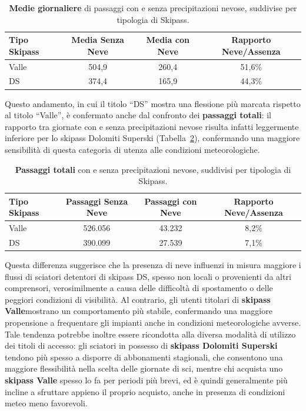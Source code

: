 \begin{table}[h]
    \centering
    \begin{tabular}{lccc}
        \toprule
        \textbf{Tipo Skipass} & \textbf{Media Senza Neve} & \textbf{Media con Neve} & \textbf{Rapporto Neve/Assenza} \\
        \midrule
        Valle & 504,9 & 260,4 & 51,6\% \\
        DS & 374,4 & 165,9 & 44,3\% \\
        \bottomrule
    \end{tabular}
    \caption{\textbf{Medie giornaliere} di passaggi con e senza precipitazioni nevose, suddivise per tipologia di Skipass.}
    \label{tab:Neve_medie}
\end{table}


Questo andamento, in cui il titolo “DS” mostra una flessione più marcata rispetto al titolo “Valle”, è confermato anche dal confronto dei \textbf{passaggi totali}: il rapporto tra giornate con e senza precipitazioni nevose risulta infatti leggermente inferiore per lo skipass Dolomiti Superski (Tabella~\ref{tab:Neve_totali}), confermando una maggiore sensibilità di questa categoria di utenza alle condizioni meteorologiche.

\begin{table}[h]
    \centering
    \begin{tabular}{lccc}
        \toprule
        \textbf{Tipo Skipass} & \textbf{Passaggi Senza Neve} & \textbf{Passaggi con Neve} & \textbf{Rapporto Neve/Assenza} \\
        \midrule
        Valle & 526.056 & 43.232 & 8,2\% \\
        DS & 390.099 & 27.539 & 7,1\% \\
        \bottomrule
    \end{tabular}
    \caption{\textbf{Passaggi totali} con e senza precipitazioni nevose, suddivisi per tipologia di Skipass.}
    \label{tab:Neve_totali}
\end{table}


Questa differenza suggerisce che la presenza di neve influenzi in misura maggiore i flussi di sciatori  detentori di skipass DS, spesso non locali o provenienti da altri comprensori, verosimilmente a causa delle difficoltà di spostamento o delle peggiori condizioni di visibilità.
Al contrario, gli utenti titolari di \textbf{skipass Valle}mostrano un comportamento più stabile, confermando una maggiore propensione a frequentare gli impianti anche in condizioni meteorologiche avverse.
Tale tendenza potrebbe inoltre essere ricondotta alla diversa modalità di utilizzo dei titoli di accesso: gli sciatori in possesso di \textbf{skipass Dolomiti Superski} tendono più spesso a disporre di abbonamenti stagionali, che consentono una maggiore flessibilità nella scelta delle giornate di sci, mentre chi acquista uno \textbf{skipass Valle} spesso lo fa per periodi più brevi, ed è quindi generalmente più incline a sfruttare appieno il proprio acquisto, anche in presenza di condizioni meteo meno favorevoli.\\

